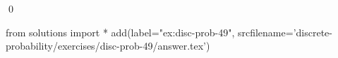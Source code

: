 
\begin{ex} 
  \label{ex:disc-prob-49}
  
  \qed
\end{ex} 
\begin{python0}
from solutions import *
add(label="ex:disc-prob-49",
    srcfilename='discrete-probability/exercises/disc-prob-49/answer.tex') 
\end{python0}
